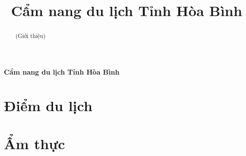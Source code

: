 \documentclass{article}
\title{Cẩm nang du lịch Tỉnh Hòa Bình}
\begin{document}
\begin{center}
    \fontsize{18}{20}\textbf{Cẩm nang du lịch Tỉnh Hòa Bình}
\end{center}
\begin{abstract}
    (Giới thiệu)
\end{abstract}
\section*{Điểm du lịch}
\newpage
\section*{{Ẩm thực}}
\end{document}
